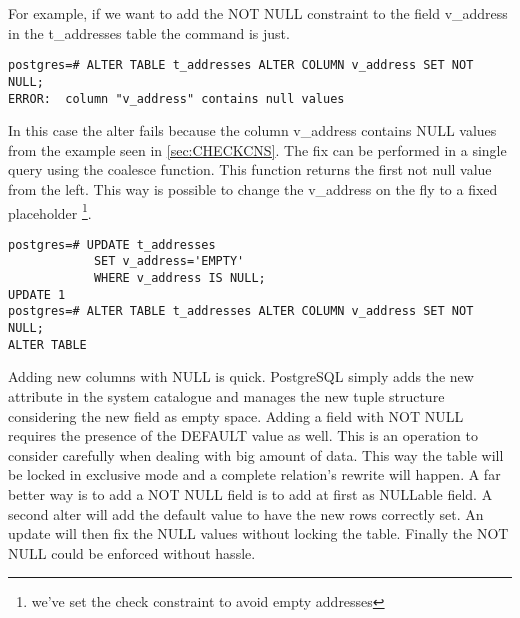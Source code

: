 For example, if we want to add the NOT NULL constraint to the field v\_address in the t\_addresses 
table the command is just.

\begin{lstlisting}[style=pgsql]
postgres=# ALTER TABLE t_addresses ALTER COLUMN v_address SET NOT NULL;
ERROR:  column "v_address" contains null values

\end{lstlisting}

In this case the alter fails because the column v\_address contains NULL values from the example 
seen in \ref{sec:CHECKCNS}. The fix can be performed in a single query using the coalesce function.
This function returns the first not null value from the left. This way is possible to change the 
v\_address on the fly to a fixed placeholder \footnote{we've set the check constraint to avoid empty 
addresses}.

\begin{lstlisting}[style=pgsql]
postgres=# UPDATE t_addresses
            SET v_address='EMPTY'
            WHERE v_address IS NULL;
UPDATE 1
postgres=# ALTER TABLE t_addresses ALTER COLUMN v_address SET NOT NULL;
ALTER TABLE

\end{lstlisting}

Adding new columns with NULL is quick. PostgreSQL simply adds the new attribute in the system 
catalogue and manages the new tuple structure considering the new field as empty space. Adding 
a field with NOT NULL requires the presence of the DEFAULT value as well. This is an operation to 
consider carefully when dealing with big amount of data. This way the table will be locked in 
exclusive mode and a complete relation's rewrite will happen. A far better way is to add a NOT NULL 
field is to add at first as NULLable field. A second alter will add the default value to have the 
new rows correctly set. An update will then fix the NULL values without locking the 
table. Finally the NOT NULL could be enforced without hassle.